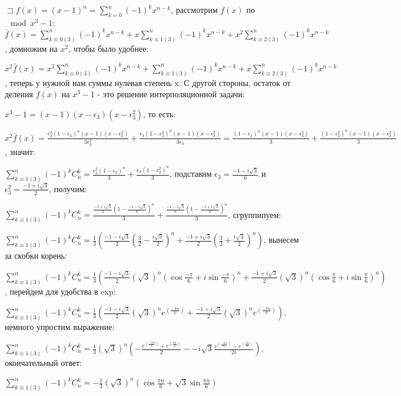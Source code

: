 \documentclass[12pt]{article}
\newenvironment{solutions}[2][Solutions]
{\begin{trivlist}\item[{\bfseries #1} {\bfseries #2.}]}{\end{trivlist}}
\begin{document}
\begin{solutions}{5} 
$\sqsupset f(x) = (x-1)^n = \sum\limits_{k=0}^n(-1)^k x^{n-k}$, рассмотрим $f(x)$ по $\mod{x^3-1}$: $\bar{f}(x) = \sum\limits_{k\equiv0(3)}^n(-1)^k x^{n-k} + x\sum\limits_{k\equiv1(3)}^n(-1)^k x^{n-k} + x^2\sum\limits_{k\equiv2(3)}^n(-1)^k x^{n-k}$, домножим на $x^2$, чтобы было удобнее: 

$x^2 \bar{f}(x) = x^2\sum\limits_{k\equiv0(3)}^n(-1)^k x^{n-k} + \sum\limits_{k\equiv1(3)}^n(-1)^k x^{n-k} + x\sum\limits_{k\equiv2(3)}^n(-1)^k x^{n-k}$, теперь у нужной нам суммы нулевая степень x. С другой стороны, остаток от деления $f(x)$ на $x^3-1$ - это решение интерполяционной задачи:

$x^3-1=(x-1)(x-\epsilon_3)(x-\epsilon^2_3)$, то есть:

$x^2 \bar{f}(x)=\frac{\epsilon^2_3(1-\epsilon_3)^n(x-1)(x-\epsilon^2_3)}{3\epsilon^2_3} + \frac{\epsilon_3(1-\epsilon^2_3)^n(x-1)(x-\epsilon^2_3)}{3\epsilon_3} = \frac{(1-\epsilon_3)^n(x-1)(x-\epsilon^2_3)}{3} + \frac{(1-\epsilon^2_3)^n(x-1)(x-\epsilon^2_3)}{3}$, значит:

$\sum\limits_{k\equiv1(3)}^n(-1)^k C^k_n = \frac{\epsilon^2_3(1-\epsilon_3)^n}{3} + \frac{\epsilon_3(1-\epsilon^2_3)^n}{3}$, подставим $\epsilon_3 = \frac{-1-i\sqrt3}{6}$ и $\epsilon^2_3 = \frac{-1+i\sqrt3}{2}$, получим:

$\sum\limits_{k\equiv1(3)}^n(-1)^k C^k_n = \frac{\frac{-1+i\sqrt3}{2}(1-\frac{-1-i\sqrt3}{6})^n}{3} + \frac{\frac{-1-i\sqrt3}{6}(1-\frac{-1+i\sqrt3}{2})^n}{3}$, сгруппипуем:

$\sum\limits_{k\equiv1(3)}^n(-1)^k C^k_n = \frac{1}{3} (\frac{-1-i\sqrt3}{2}(\frac{3}{2}-\frac{i\sqrt{3}}{2})^n + \frac{-1+i\sqrt3}{2}(\frac{3}{2}+\frac{i\sqrt{3}}{2})^n)$, вынесем за скобки корень:

$\sum\limits_{k\equiv1(3)}^n(-1)^k C^k_n = \frac{1}{3} (\frac{-1-i\sqrt3}{2}(\sqrt{3})^n(\cos{\frac{-\pi}{6}}+i\sin{\frac{-\pi}{6}})^n + \frac{-1+i\sqrt3}{2}(\sqrt{3})^n(\cos{\frac{\pi}{6}}+i\sin{\frac{\pi}{6}})^n)$, перейдем для удобства в exp: 

$\sum\limits_{k\equiv1(3)}^n(-1)^k C^k_n = \frac{1}{3} (\frac{-1-i\sqrt3}{2}(\sqrt{3})^n e^(\frac{-\pi n}{6}) + \frac{-1+i\sqrt3}{2}(\sqrt{3})^n e^(\frac{-\pi n}{6}))$, немного упростим выражение: 

$\sum\limits_{k\equiv1(3)}^n(-1)^k C^k_n = \frac{1}{3} (\sqrt{3})^n (- \frac{e^(\frac{-\pi n}{6})+e^(\frac{\pi n}{6})}{2} - -i\sqrt3 \frac{e^(\frac{-\pi n}{6}) - e^(\frac{\pi n}{6})}{2i})$, окончательный ответ:

$\sum\limits_{k\equiv1(3)}^n(-1)^k C^k_n = -\frac{1}{3} (\sqrt{3})^n (\cos{\frac{\pi n}{6}} + \sqrt{3} \sin{\frac{\pi n}{6}} )$
\end{solutions}
\end{document}
